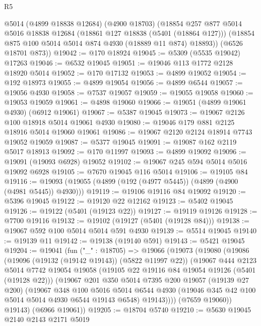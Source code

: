 \begin{lexlean}{R5}
\begin{coremodule}
      @5014
      (@4899 @18838 @12684)
      (@4900 @18703)
      (@18854
        @257
        @877
        @5014
        @5016
        @18838
        @12684
        (@18861 @127 @18838 (@5401 (@18864 @127)))
        (@18854 @875 @100 @5014 @5014 @874 @4930 (@18889 @11 @874) @18893))
      (@6526 @18701 @873))
@19042 := @170 @18924
@19045 := @5309 (@5535 @19042) @17263
@19046 := @6532 @19045
@19051 := @19046 @113 @1772 @2128 @18920 @5014
@19052 := @170 @17132
@19053 := @4899 @19052
@19054 := @192 @18973
@19055 := @4899 @19054
@19056 := @4899 @6544
@19057 := @19056 @4930
@19058 := @7537 @19057
@19059 := @19055 @19058
@19060 := @19053 @19059
@19061 := @4898 @19060
@19066 := @19051 (@4899 @19061 @4930) (@6912 @19061)
@19067 := @5387 @19045
@19073 := @19067 @2126 @100 @18918 @5014 @19061 @4930
@19080 := @19046 @179 @881 @2125 @18916 @5014 @19060 @19061
@19086 := @19067 @2120 @2124 @18914 @7743 @19052 @19059
@19087 := @5377 @19045
@19091 := @19087 @162 @2119 @5017 @18913
@19092 := @170 @11997
@19093 := @4899 @19092
@19096 := @19091 (@19093 @6928) @19052
@19102 := @19067 @245 @594 @5014 @5016 @19092 @6928
@19105 := @7670 @19045 @116 @5014
@19106 := @19105 @84
@19116 := @19093 (@19055 (@4899 (@192 (@4977 @5445)) (@4899 (@4900 (@4981 @5445)) @4930)))
@19119 := @19106 @19116 @84 @19092
@19120 := @5396 @19045
@19122 := @19120 @22 @12162
@19123 := @5402 @19045
@19126 := @19122 (@5401 (@19123 @22))
@19127 := @19119 @19126
@19128 := @7700 @19116
@19132 := @19102 (@19127 (@5401 (@19128 @84)))
@19138 := @19067 @592 @100 @5014 @5014 @591 @4930
@19139 := @5514 @19045
@19140 := @19139 @11
@19142 := @19138 (@19140 @591)
@19143 := @5421 @19045
@19204 := @19041
    (fun ("_" : @18705) =>
    @19066
      (@19073
        (@19080
          (@19086
            (@19096 (@19132 (@19142 @19143)) (@5822 @11997 @22))
            (@19067
              @444
              @2123
              @5014
              @7742
              @19054
              @19058
              (@19105 @22 @19116 @84 @19054 @19126 (@5401 (@19128 @22)))
              (@19067
                @201
                @350
                @5014
                @7395
                @200
                @19057
                (@19139 @27 @200)
                (@19067
                  @348
                  @100
                  @5016
                  @5014
                  @6544
                  @4930
                  (@19046 @345 @42 @100 @5014 @5014 @4930 @6544 @19143 @6548)
                  @19143))))
          (@7659 @19060))
        @19143)
      (@6966 @19061))
@19205 := @18704 @5740
@19210 := @5630 @19045 @2140 @2143 @2171 @5019

\end{coremodule}
\end{lexlean}
